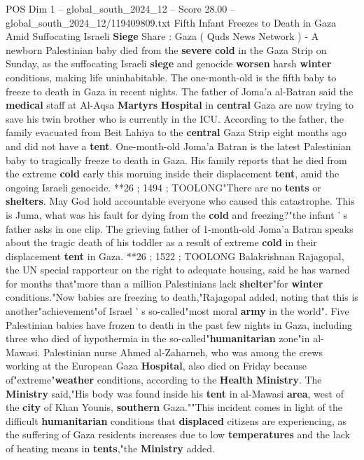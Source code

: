 \begin{textsample}{POS Dim 1 – global\_south\_2024\_12 – Score 28.00 – global\_south\_2024\_12/119409809.txt}  \label{ex:f1_pos_110}
Fifth Infant Freezes to Death in Gaza Amid Suffocating Israeli \textbf{Siege} Share : Gaza ( Quds News Network ) - A newborn Palestinian baby died from the \textbf{severe} \textbf{cold} in the Gaza Strip on Sunday, as the suffocating Israeli \textbf{siege} and genocide \textbf{worsen} harsh \textbf{winter} conditions, making life uninhabitable.
The one-month-old is the fifth baby to freeze to death in Gaza in recent nights.
The father of Joma'a al-Batran said the \textbf{medical} staff at Al-Aqsa \textbf{Martyrs} \textbf{Hospital} in \textbf{central} Gaza are now trying to save his twin brother who is currently in the ICU.
According to the father, the family evacuated from Beit Lahiya to the \textbf{central} Gaza Strip eight months ago and did not have a \textbf{tent}.
One-month-old Joma'a Batran is the latest Palestinian baby to tragically freeze to death in Gaza.
His family reports that he died from the extreme \textbf{cold} early this morning inside their displacement \textbf{tent}, amid the ongoing Israeli genocide. **26 ; 1494 ; TOOLONG"There are no \textbf{tents} or \textbf{shelters}.
May God hold accountable everyone who caused this catastrophe.
This is Juma, what was his fault for dying from the \textbf{cold} and freezing?"the infant ' s father asks in one clip.
The grieving father of 1-month-old Joma'a Batran speaks about the tragic death of his toddler as a result of extreme \textbf{cold} in their displacement \textbf{tent} in Gaza. **26 ; 1522 ; TOOLONG Balakrishnan Rajagopal, the UN special rapporteur on the right to adequate housing, said he has warned for months that"more than a million Palestinians lack \textbf{shelter}"for \textbf{winter} conditions."Now babies are freezing to death,"Rajagopal added, noting that this is another"achievement"of Israel ' s so-called"most moral \textbf{army} in the world".
Five Palestinian babies have frozen to death in the past few nights in Gaza, including three who died of hypothermia in the so-called"\textbf{humanitarian} zone"in al-Mawasi.
Palestinian nurse Ahmed al-Zaharneh, who was among the crews working at the European Gaza \textbf{Hospital}, also died on Friday because of"extreme"\textbf{weather} conditions, according to the \textbf{Health} \textbf{Ministry}.
The \textbf{Ministry} said,"His body was found inside his \textbf{tent} in al-Mawasi \textbf{area}, west of the \textbf{city} of Khan Younis, \textbf{southern} Gaza.""This incident comes in light of the difficult \textbf{humanitarian} conditions that \textbf{displaced} citizens are experiencing, as the suffering of Gaza residents increases due to low \textbf{temperatures} and the lack of heating means in \textbf{tents},"the \textbf{Ministry} added.

\end{textsample}
